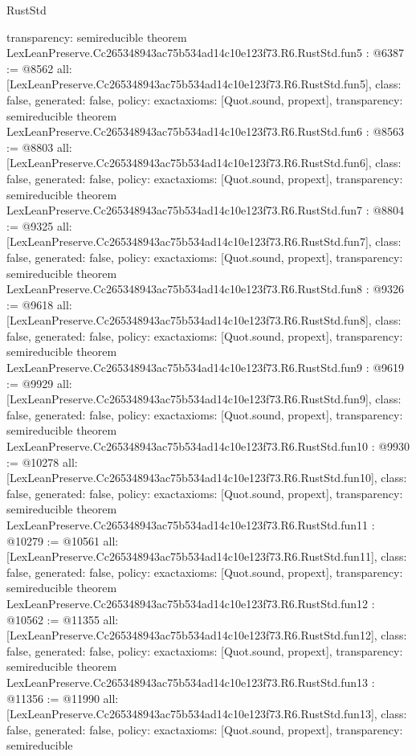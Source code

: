\begin{lexlean}{RustStd}
\begin{coremodule}
{  transparency: semireducible
}
theorem LexLeanPreserve.Cc265348943ac75b534ad14c10e123f73.R6.RustStd.fun5 : @6387 := @8562 {
  all: [LexLeanPreserve.Cc265348943ac75b534ad14c10e123f73.R6.RustStd.fun5],
  class: false,
  generated: false,
  policy: exact{axioms: [Quot.sound, propext]},
  transparency: semireducible
}
theorem LexLeanPreserve.Cc265348943ac75b534ad14c10e123f73.R6.RustStd.fun6 : @8563 := @8803 {
  all: [LexLeanPreserve.Cc265348943ac75b534ad14c10e123f73.R6.RustStd.fun6],
  class: false,
  generated: false,
  policy: exact{axioms: [Quot.sound, propext]},
  transparency: semireducible
}
theorem LexLeanPreserve.Cc265348943ac75b534ad14c10e123f73.R6.RustStd.fun7 : @8804 := @9325 {
  all: [LexLeanPreserve.Cc265348943ac75b534ad14c10e123f73.R6.RustStd.fun7],
  class: false,
  generated: false,
  policy: exact{axioms: [Quot.sound, propext]},
  transparency: semireducible
}
theorem LexLeanPreserve.Cc265348943ac75b534ad14c10e123f73.R6.RustStd.fun8 : @9326 := @9618 {
  all: [LexLeanPreserve.Cc265348943ac75b534ad14c10e123f73.R6.RustStd.fun8],
  class: false,
  generated: false,
  policy: exact{axioms: [Quot.sound, propext]},
  transparency: semireducible
}
theorem LexLeanPreserve.Cc265348943ac75b534ad14c10e123f73.R6.RustStd.fun9 : @9619 := @9929 {
  all: [LexLeanPreserve.Cc265348943ac75b534ad14c10e123f73.R6.RustStd.fun9],
  class: false,
  generated: false,
  policy: exact{axioms: [Quot.sound, propext]},
  transparency: semireducible
}
theorem LexLeanPreserve.Cc265348943ac75b534ad14c10e123f73.R6.RustStd.fun10 : @9930 := @10278 {
  all: [LexLeanPreserve.Cc265348943ac75b534ad14c10e123f73.R6.RustStd.fun10],
  class: false,
  generated: false,
  policy: exact{axioms: [Quot.sound, propext]},
  transparency: semireducible
}
theorem LexLeanPreserve.Cc265348943ac75b534ad14c10e123f73.R6.RustStd.fun11 : @10279 := @10561 {
  all: [LexLeanPreserve.Cc265348943ac75b534ad14c10e123f73.R6.RustStd.fun11],
  class: false,
  generated: false,
  policy: exact{axioms: [Quot.sound, propext]},
  transparency: semireducible
}
theorem LexLeanPreserve.Cc265348943ac75b534ad14c10e123f73.R6.RustStd.fun12 : @10562 := @11355 {
  all: [LexLeanPreserve.Cc265348943ac75b534ad14c10e123f73.R6.RustStd.fun12],
  class: false,
  generated: false,
  policy: exact{axioms: [Quot.sound, propext]},
  transparency: semireducible
}
theorem LexLeanPreserve.Cc265348943ac75b534ad14c10e123f73.R6.RustStd.fun13 : @11356 := @11990 {
  all: [LexLeanPreserve.Cc265348943ac75b534ad14c10e123f73.R6.RustStd.fun13],
  class: false,
  generated: false,
  policy: exact{axioms: [Quot.sound, propext]},
  transparency: semireducible
}
\end{coremodule}
\end{lexlean}
